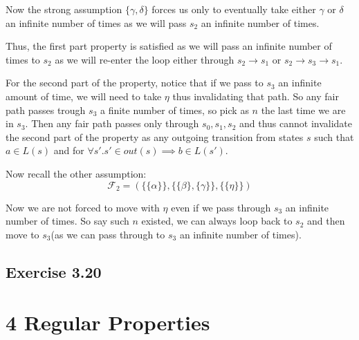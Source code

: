 \documentclass{article}
\begin{document}
\begin{enumerate}[label=(\alph*)]
		Now the strong assumption $\{\gamma, \delta\}$ forces us only to eventually take either $\gamma$ or $\delta$ an infinite number of times as we will pass $s_2$ an infinite number of times.
		
		Thus, the first part property is satisfied as we will pass an infinite number of times to $s_2$ as we will re-enter the loop either through $s_2 \rightarrow s_1$ or $s_2 \rightarrow s_3 \rightarrow s_1$.

		For the second part of the property, notice that if we pass to $s_3$ an infinite amount of time, we will need to take $\eta$ thus invalidating that path.
		So any fair path passes trough $s_3$ a finite number of times, so pick as $n$ the last time we are in $s_3$.
		Then any fair path passes only through $s_0, s_1, s_2$ and thus cannot invalidate the second part of the property as any outgoing transition from states $s$ such that $a \in L(s)$ and for $\forall s'. s' \in out(s) \implies b \in L(s')$.  
		
		Now recall the other assumption:
		$$
		\mathcal{F}_2=(\{\{\alpha\}\}, \{\{\beta \}, \{\gamma\}\}, \{ \{\eta\} \})
		$$
		
		Now we are not forced to move with $\eta$ even if we pass through $s_3$ an infinite number of times. So say such $n$ existed, we can always loop back to $s_2$ and then move to $s_3$(as we can pass through to $s_3$ an infinite number of times).
	\end{enumerate}
	\subsection*{Exercise 3.20}
	\newpage
	\section{4 Regular Properties}
\end{document}
